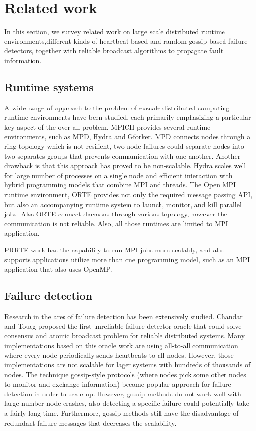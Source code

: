 \documentclass[sigconf]{acmart}
\begin{document}
\section{Related work}
In this section, we survey related work on large scale distributed runtime environments,different kinds of heartbeat based and random gossip based failure detectors, together with reliable broadcast algorithms to propagate fault information.

\subsection{Runtime systems}
A wide range of approach to the problem of exscale distributed computing runtime environments have been studied, each primarily emphasizing a particular key aspect of the over all problem. MPICH provides several runtime environments, such as MPD\cite{Butler00}, Hydra and Gforker\cite{MPICH14}. MPD connects nodes through a ring topology which is not resilient, two node failures could separate nodes into two separates groups that prevents communication with one another. Another drawback is that this approach has proved to be non-scalable. Hydra scales well for large number of processes on a single node and efficient interaction with hybrid programming models that combine MPI and threads. The Open MPI runtime environment, ORTE\cite{Castain05}\cite{Jeffrey12} provides not only the required message passing API, but also an accompanying runtime system to launch, monitor, and kill parallel jobs. Also ORTE connect daemons through various topology, however the communication is not reliable. Also, all those runtimes are limited to MPI application.

PRRTE work has the capability to run MPI jobs more scalably, and also supports applications utilize more than one programming model, such as an MPI application that also uses OpenMP. 

\subsection{Failure detection}
Research in the ares of failure detection has been extensively studied. Chandar and Toueg\cite{Chandra96} proposed the first unreliable failure detector oracle that could solve consensus and atomic broadcast problem for reliable distributed systems. Many implementations\cite{Wei02}\cite{Larrea00}\cite{Kawazoe97} based on this oracle work are using all-to-all communication where every node periodically sends heartbeats to all nodes. However, those implementations are not scalable for lager systems with hundreds of thousands of nodes. The technique gossip-style protocols\cite{van98} \cite{Ranganathan01}\cite{Gupta01}\cite{Abhinandan02}  (where nodes pick some other nodes to monitor and exchange information) become popular approach for failure detection in order to scale up. However, gossip methods do not work well with large number node crashes, also detecting a specific failure could potentially take a fairly long time. Furthermore, gossip methods still have the disadvantage of redundant failure messages that decreases the scalability.
\end{document}
